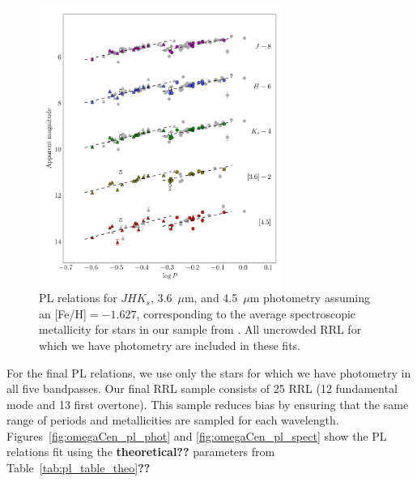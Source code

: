 \documentclass[a4paper,fleqn,usenatbib]{mnras}
\begin{document}
\begin{figure}
\begin{center}
\includegraphics[width=80mm]{reworked_fitting_code/final_plots/multiwavelength_PL_m4_clipped.pdf}
\caption{PL relations for $J\!H\!K_s$, 3.6~$\mu$m, and 4.5~$\mu$m photometry assuming an [Fe/H]$=-1.627$, corresponding to the average spectroscopic metallicity for stars in our sample from \citep{2006ApJ...640L..43S}. All uncrowded RRL for which we have photometry are included in these fits.}
\label{fig:omegaCen_pl_m4}
\end{center}
\end{figure}


For the final PL relations, we use only the stars for which we have photometry in all five bandpasses. Our final RRL sample consists of 25 RRL (12 fundamental mode and 13 first overtone). This sample reduces bias by ensuring that the same range of periods and metallicities are sampled for each wavelength. Figures~\ref{fig:omegaCen_pl_phot} and \ref{fig:omegaCen_pl_spect} show the PL relations fit using the {\bf theoretical??} parameters from Table~\ref{tab:pl_table_theo}{\bf??}

\end{document}
